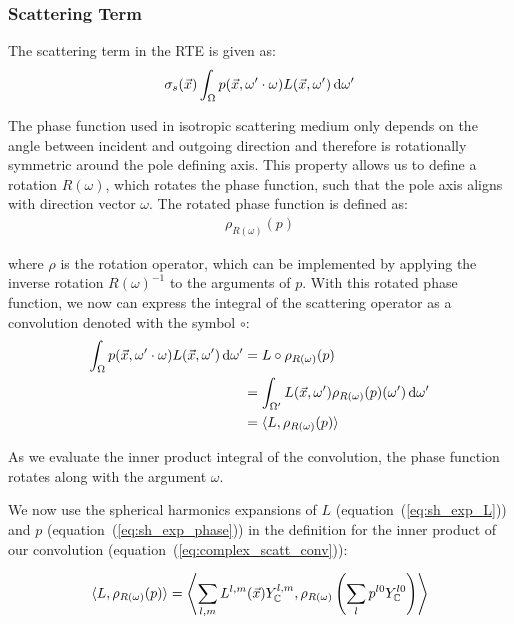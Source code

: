 \documentclass[10pt]{scrartcl}
\begin{document}
\subsubsection{Scattering Term}
\label{sec:complex_scattering_term}

The scattering term in the RTE is given as:
\begin{align*}
\sigma_s(\vec{x})\int_{\Omega}p(\vec{x}, \omega'\cdot\omega)L(\vec{x}, \omega')\,\mathrm{d}\omega'
\end{align*}

The phase function used in isotropic scattering medium only depends on the angle between incident and outgoing direction and therefore is rotationally symmetric around the pole defining axis. This property allows us to define a rotation $R(\omega)$, which rotates the phase function, such that the pole axis aligns with direction vector $\omega$. The rotated phase function is defined as:
\begin{align*}
\rho_{R(\omega)}(p)
\end{align*}

where $\rho$ is the rotation operator, which can be implemented by applying the inverse rotation $R(\omega)^{-1}$ to the arguments of $p$. With this rotated phase function, we now can express the integral of the scattering operator as a convolution denoted with the symbol $\circ$: 
\begin{align}
\int_{\Omega}p(\vec{x}, \omega'\cdot\omega)L(\vec{x}, \omega')\,\mathrm{d}\omega'
&=
L\circ \rho_{R(\omega)}(p) \nonumber\\
&=
\int_{\Omega'}{L(\vec{x}, \omega')\rho_{R(\omega)}(p)(\omega')\,\mathrm{d}\omega'} \nonumber\\
&= \langle L,  \rho_{R(\omega)}(p)\rangle
\label{eq:complex_scatt_conv}
\end{align}

As we evaluate the inner product integral of the convolution, the phase function rotates along with the argument $\omega$.

We now use the spherical harmonics expansions of $L$ (equation~(\ref{eq:sh_exp_L})) and $p$ (equation~(\ref{eq:sh_exp_phase})) in the definition for the inner product of our convolution (equation~(\ref{eq:complex_scatt_conv})):

\begin{align*}
\langle L,  \rho_{R(\omega)}(p)\rangle = \left < \sum_{l,m}{L^{l,m}(\vec{x}) Y_{\mathbb{C}}^{l,m}}, \rho_{R(\omega)}\left ( \sum_{l}{p^{l0}Y_{\mathbb{C}}^{l0}} \right )\right>
\end{align*}
\end{document}
